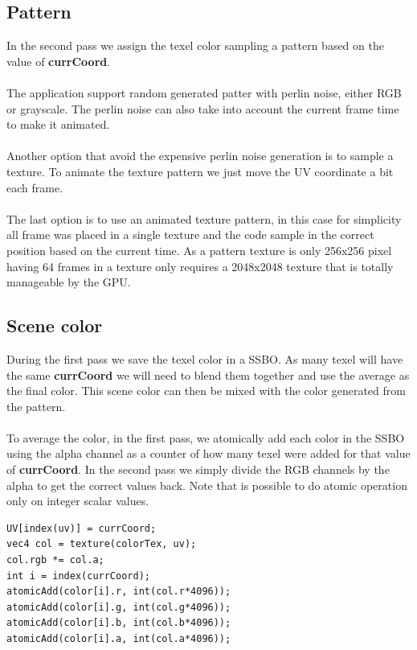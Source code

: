\documentclass[12pt, a4paper]{article}
\begin{document}
\subsection{Pattern}
In the second pass we assign the texel color sampling a pattern based on the value of \textbf{currCoord}.\\\\
The application support random generated patter with perlin noise, either RGB or grayscale. The perlin noise
can also take into account the current frame time to make it animated.\\\\
Another option that avoid the expensive perlin noise generation is to sample a texture. To animate the texture pattern
we just move the UV coordinate a bit each frame.\\\\
The last option is to use an animated texture pattern, in this case for simplicity all frame was placed in a single texture
and the code sample in the correct position based on the current time. As a pattern texture is only 256x256 pixel having
64 frames in a texture only requires a 2048x2048 texture that is totally manageable by the GPU.

\subsection{Scene color}
During the first pass we save the texel color in a SSBO. As many texel will have the same \textbf{currCoord} we will
need to blend them together and use the average as the final color. This scene color can then be mixed with the color
generated from the pattern.\\\\
To average the color, in the first pass, we atomically add each color in the SSBO using the alpha channel as a counter of how many texel
were added for that value of \textbf{currCoord}. In the second pass we simply divide the RGB channels by the alpha to get the correct values back.
Note that is possible to do atomic operation only on integer scalar values.
\begin{lstlisting}[caption={First pass color blending},captionpos=b]
UV[index(uv)] = currCoord;
vec4 col = texture(colorTex, uv);
col.rgb *= col.a;
int i = index(currCoord);
atomicAdd(color[i].r, int(col.r*4096));
atomicAdd(color[i].g, int(col.g*4096));
atomicAdd(color[i].b, int(col.b*4096));
atomicAdd(color[i].a, int(col.a*4096));
\end{lstlisting}
\end{document}
